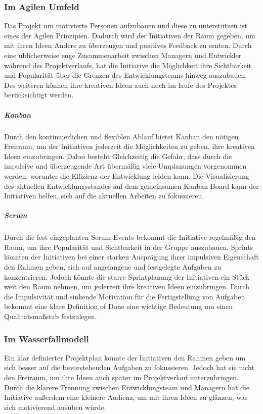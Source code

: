 \documentclass[twocolumn,10pt]{asme2ej}
\begin{document}
\subsubsection{Im Agilen Umfeld}
Das Projekt um motivierte Personen aufzubauen und diese zu unterstützen ist eines der Agilen Prinzipien. Dadurch wird der Initiativen der Raum gegeben, um mit ihren Ideen Andere zu überzeugen und positives Feedback zu ernten. Durch eine üblicherweise enge Zusammenarbeit zwischen Managern und Entwickler während des Projektverlaufs, hat die Initiative die Möglichkeit ihre Sichtbarkeit und Popularität über die Grenzen des Entwicklungsteams hinweg auszubauen. Des weiteren können ihre kreativen Ideen auch noch im laufe des Projektes berücksichtigt werden.

\subparagraph{Kanban} Durch den kontinuierlichen und flexiblen Ablauf bietet Kanban den nötigen Freiraum, um der Initiativen jederzeit die Möglichkeiten zu geben, ihre kreativen Ideen einzubringen. Dabei besteht Gleichzeitig die Gefahr, dass durch die impulsive und überzeugende Art übermäßig viele Umplanungen vorgenommen werden, worunter die Effizienz der Entwicklung leiden kann. Die Visualisierung des aktuellen Entwicklungsstandes auf dem gemeinsamen Kanban Board kann der Initiativen helfen, sich auf die aktuellen Arbeiten zu fokussieren. 

\subparagraph{Scrum} Durch die fest eingeplanten Scrum Events bekommt die Initiative regelmäßig den Raum, um ihre Popularität und Sichtbarkeit in der Gruppe auszubauen. Sprints könnten der Initiativen bei einer starken Ausprägung ihrer impulsiven Eigenschaft den Rahmen geben, sich auf angefangene und festgelegte Aufgaben zu konzentrieren. Jedoch könnte die starre Sprintplanung der Initiativen ein Stück weit den Raum nehmen, um jederzeit ihre kreativen Ideen einzubringen. Durch die Impulsivität und sinkende Motivation für die Fertigstellung von Aufgaben bekommt eine klare Definition of Done eine wichtige Bedeutung um einen Qualitätsmaßstab festzulegen. 

\subsubsection{Im Wasserfallmodell}
Ein klar definierter Projektplan könnte der Initiativen den Rahmen geben um sich besser auf die bevorstehenden Aufgaben zu fokussieren. Jedoch hat sie nicht den Freiraum, um ihre Ideen auch später im Projektverlauf unterzubringen. Durch die klarere Trennung zwischen Entwicklungsteam und Managern hat die Initiative außerdem eine kleinere Audienz, um mit ihren Ideen zu glänzen, was sich motivierend ausüben würde.
\end{document}
